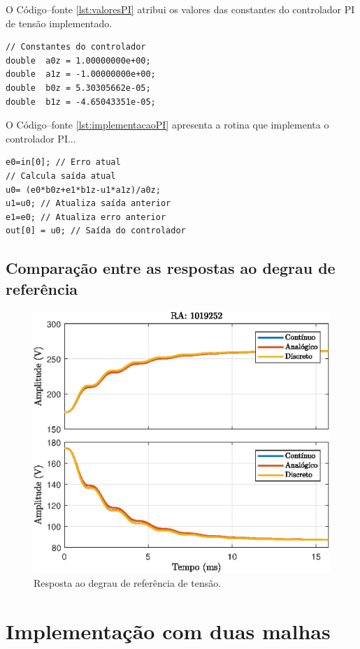 O Código--fonte \ref{lst:valoresPI} atribui os valores das constantes do controlador PI de tensão implementado.
\begin{lstlisting}[caption={Parâmetros do controlador PI digital de tensão.},label={lst:valoresPI}]
// Constantes do controlador
double  a0z = 1.00000000e+00;
double  a1z = -1.00000000e+00;
double  b0z = 5.30305662e-05;
double  b1z = -4.65043351e-05;
\end{lstlisting}
O Código--fonte \ref{lst:implementacaoPI} apresenta a rotina que implementa o controlador PI...
\begin{lstlisting}[caption={Implementação do controlador PI digital de tensão.},label={lst:implementacaoPI}]
e0=in[0]; // Erro atual
// Calcula saída atual 
u0= (e0*b0z+e1*b1z-u1*a1z)/a0z; 
u1=u0; // Atualiza saída anterior
e1=e0; // Atualiza erro anterior    
out[0] = u0; // Saída do controlador
\end{lstlisting}


\subsection{Comparação entre as respostas ao degrau de referência}


\begin{figure}[!ht]
	\centering
	\includegraphics[width=0.9\linewidth]{Figs/BoostStepResponse1malhaTodos}
	\caption{Resposta ao degrau de referência de tensão.}
	\label{fig:stepresponse1malha}
\end{figure}


\section{Implementação com duas malhas}



